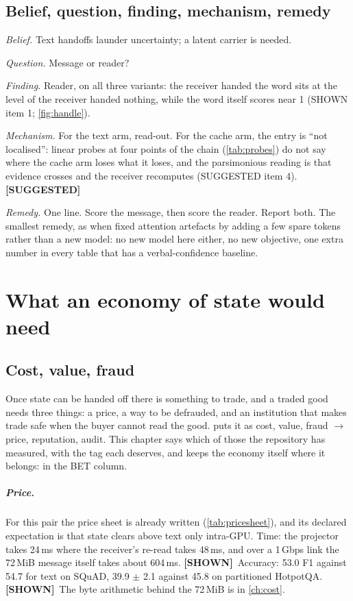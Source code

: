 \documentclass[11pt,a4paper]{report}
\newcommand{\SHOWN}{\textcolor{shownc}{\textbf{\scriptsize[SHOWN]}}}
\newcommand{\SUGG}{\textcolor{suggc}{\textbf{\scriptsize[SUGGESTED]}}}
\begin{document}
\section{Belief, question, finding, mechanism, remedy}

\emph{Belief.} Text handoffs launder uncertainty; a latent carrier is needed.

\emph{Question.} Message or reader?

\emph{Finding.} Reader, on all three variants: the receiver handed the word sits at the level of the receiver handed nothing, while the word itself scores near 1 (SHOWN item 1; \cref{fig:handle}).

\emph{Mechanism.} For the text arm, read-out. For the cache arm, the entry is ``not localised'': linear probes at four points of the chain (\cref{tab:probes}) do not say where the cache arm loses what it loses, and the parsimonious reading is that evidence crosses and the receiver recomputes (SUGGESTED item 4). \SUGG

\emph{Remedy.} One line. Score the message, then score the reader. Report both. The smallest remedy, as when \citet{darcet2024registers} fixed attention artefacts by adding a few spare tokens rather than a new model: no new model here either, no new objective, one extra number in every table that has a verbal-confidence baseline.

\chapter{What an economy of state would need}
\label{ch:economy}

\section{Cost, value, fraud}

Once state can be handed off there is something to trade, and a traded good needs three things: a price, a way to be defrauded, and an institution that makes trade safe when the buyer cannot read the good.  puts it as cost, value, fraud $\to$ price, reputation, audit. This chapter says which of those the repository has measured, with the tag each deserves, and keeps the economy itself where it belongs: in the BET column.

\paragraph{Price.} For this pair the price sheet is already written (\cref{tab:pricesheet}), and its declared expectation is that state clears above text only intra-GPU. Time: the projector takes 24\,ms where the receiver's re-read takes 48\,ms, and over a 1\,Gbps link the 72\,MiB message itself takes about 604\,ms. \SHOWN\ Accuracy: 53.0 F1 against 54.7 for text on SQuAD, 39.9 $\pm$ 2.1 against 45.8 on partitioned HotpotQA. \SHOWN\ The byte arithmetic behind the 72\,MiB is in \cref{ch:cost}.
\end{document}

